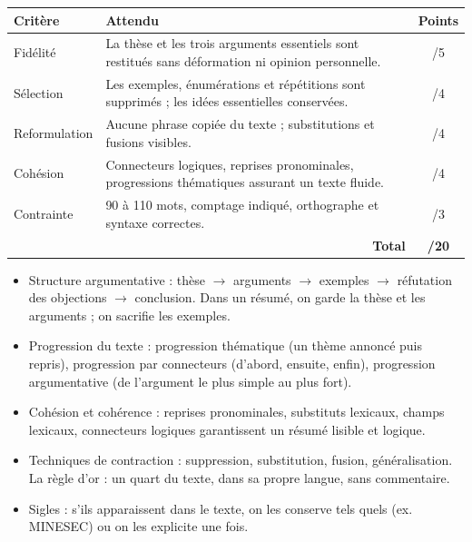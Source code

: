 \documentclass[11pt]{article}
\newcommand{\cle}[1]{{\popxbold\color{popdark}#1}}
\newcounter{popsec}
\newcounter{popsub}
\newcommand{\courssub}[1]{%
  \stepcounter{popsub}%
  \par\vspace{9pt}\noindent{\popxbold\fontsize{11.5}{13}\selectfont\color{popink}{\color{poporange}\thepopsec.\thepopsub}\hspace{6pt}#1}\par\nopagebreak\vspace{4pt}
}
\begin{document}
\begin{center}
\begin{tabularx}{\linewidth}{|l|X|c|}
\hline
\rowcolor{popblueL} \textbf{Critère} & \textbf{Attendu} & \textbf{Points} \\
\hline
Fidélité & La thèse et les trois arguments essentiels sont restitués sans déformation ni opinion personnelle. & /5 \\
\hline
Sélection & Les exemples, énumérations et répétitions sont supprimés ; les idées essentielles conservées. & /4 \\
\hline
Reformulation & Aucune phrase copiée du texte ; substitutions et fusions visibles. & /4 \\
\hline
Cohésion & Connecteurs logiques, reprises pronominales, progressions thématiques assurant un texte fluide. & /4 \\
\hline
Contrainte & 90 à 110 mots, comptage indiqué, orthographe et syntaxe correctes. & /3 \\
\hline
\multicolumn{2}{|r|}{\textbf{Total}} & \textbf{/20} \\
\hline
\end{tabularx}
\end{center}

\courssub{Ressources à mobiliser}

\begin{aretenir}
\begin{itemize}
\item \cle{Structure argumentative} : thèse $\rightarrow$ arguments $\rightarrow$ exemples $\rightarrow$ réfutation des objections $\rightarrow$ conclusion. Dans un résumé, on garde la thèse et les arguments ; on sacrifie les exemples.
\item \cle{Progression du texte} : progression thématique (un thème annoncé puis repris), progression par connecteurs (d'abord, ensuite, enfin), progression argumentative (de l'argument le plus simple au plus fort).
\item \cle{Cohésion et cohérence} : reprises pronominales, substituts lexicaux, champs lexicaux, connecteurs logiques garantissent un résumé lisible et logique.
\item \cle{Techniques de contraction} : suppression, substitution, fusion, généralisation. La règle d'or : un quart du texte, dans sa propre langue, sans commentaire.
\item \cle{Sigles} : s'ils apparaissent dans le texte, on les conserve tels quels (ex. MINESEC) ou on les explicite une fois.
\end{itemize}
\end{aretenir}
\end{document}
